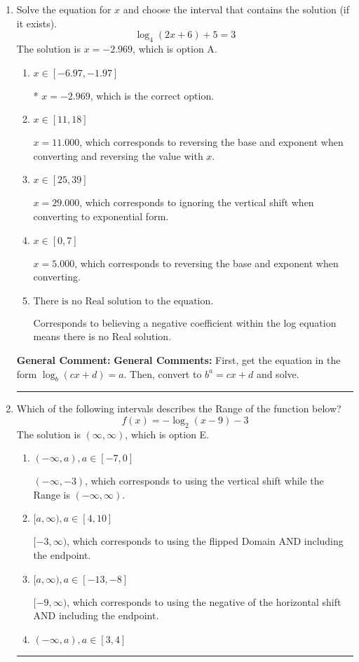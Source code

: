 \documentclass{extbook}[14pt]
\newcommand{\litem}[1]{\item #1

\rule{\textwidth}{0.4pt}}
\begin{document}
\begin{enumerate}\litem{
Solve the equation for $x$ and choose the interval that contains the solution (if it exists).
\[ \log_{4}{(2x+6)}+5 = 3 \]The solution is \( x = -2.969 \), which is option A.\begin{enumerate}[label=\Alph*.]
\item \( x \in [-6.97, -1.97] \)

* $x = -2.969$, which is the correct option.
\item \( x \in [11, 18] \)

$x = 11.000$, which corresponds to reversing the base and exponent when converting and reversing the value with $x$.
\item \( x \in [25, 39] \)

$x = 29.000$, which corresponds to ignoring the vertical shift when converting to exponential form.
\item \( x \in [0, 7] \)

$x = 5.000$, which corresponds to reversing the base and exponent when converting.
\item \( \text{There is no Real solution to the equation.} \)

Corresponds to believing a negative coefficient within the log equation means there is no Real solution.
\end{enumerate}

\textbf{General Comment:} \textbf{General Comments:} First, get the equation in the form $\log_b{(cx+d)} = a$. Then, convert to $b^a = cx+d$ and solve.
}
\litem{
Which of the following intervals describes the Range of the function below?
\[ f(x) = -\log_2{(x-9)}-3 \]The solution is \( (\infty, \infty) \), which is option E.\begin{enumerate}[label=\Alph*.]
\item \( (-\infty, a), a \in [-7, 0] \)

$(-\infty, -3)$, which corresponds to using the vertical shift while the Range is $(-\infty, \infty)$.
\item \( [a, \infty), a \in [4, 10] \)

$[-3, \infty)$, which corresponds to using the flipped Domain AND including the endpoint.
\item \( [a, \infty), a \in [-13, -8] \)

$[-9, \infty)$, which corresponds to using the negative of the horizontal shift AND including the endpoint.
\item \( (-\infty, a), a \in [3, 4] \)


\end{enumerate}}
\end{enumerate}
\end{document}
